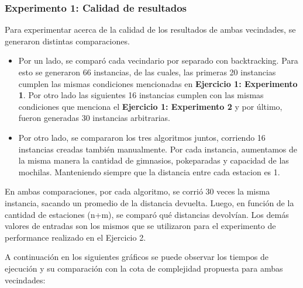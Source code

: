         \subsubsection{Experimento 1: Calidad de resultados} 

            Para experimentar acerca de la calidad de los resultados de ambas vecindades, se generaron distintas comparaciones. 

            \begin{itemize}
                \item Por un lado, se comparó cada vecindario por separado con backtracking. Para esto se generaron 66 instancias, de las cuales, las primeras 20 instancias cumplen las mismas condiciones mencionadas en \textbf{Ejercicio 1: Experimento 1}. Por otro lado las siguientes 16 instancias  cumplen con las mismas condiciones que menciona el \textbf{Ejercicio 1: Experimento 2} y por último, fueron generadas 30 instancias arbitrarias.
 
                \item Por otro lado, se compararon los tres algoritmos juntos, corriendo 16 instancias creadas también manualmente. Por cada instancia, aumentamos de la misma manera la cantidad de gimnasios, pokeparadas y capacidad de las mochilas. Manteniendo siempre que la distancia entre cada estacion es 1.
            \end{itemize}

             En ambas comparaciones, por cada algoritmo, se corrió 30 veces la misma instancia, sacando un promedio de la distancia devuelta. Luego, en función de la cantidad de estaciones (n+m), se comparó qué distancias devolvían. Los demás valores de entradas son los mismos que se utilizaron para el experimento de performance realizado en el Ejercicio 2.
			 
			 \par A continuación en los siguientes gráficos se puede observar los tiempos de ejecución y su comparación con la cota de complejidad propuesta para ambas vecindades:

\blindtext

